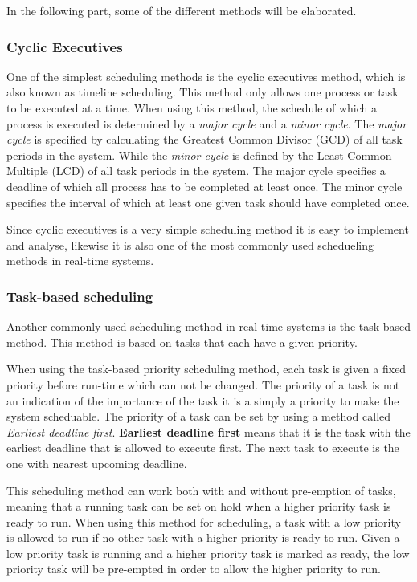 In the following part, some of the different methods will be elaborated. 

\subsubsection{Cyclic Executives}
One of the simplest scheduling methods is the cyclic executives method, which is also known as timeline scheduling.
This method only allows one process or task to be executed at a time. 
When using this method, the schedule of which a process is executed is determined by a \textit{major cycle} and a \textit{minor cycle}.
The \textit{major cycle} is specified by calculating the Greatest Common Divisor (GCD) of all task periods in the system.
While the \textit{minor cycle} is defined by the Least Common Multiple (LCD) of all task periods in the system. 
The major cycle specifies a deadline of which all process has to be completed at least once.
The minor cycle specifies the interval of which at least one given task should have completed once. 

Since cyclic executives is a very simple scheduling method it is easy to implement and analyse, likewise it is also one of the most commonly used schedueling methods in real-time systems\cite{RealTimeEmbeddedSystems}. 

\subsubsection{Task-based scheduling}
Another commonly used scheduling method in real-time systems is the task-based method. 
This method is based on tasks that each have a given priority.

When using the task-based priority scheduling method, each task is given a fixed priority before run-time which can not be changed.
The priority of a task is not an indication of the importance of the task it is a simply a priority to make the system scheduable\cite{RealTimeEmbeddedSystems}. 
The priority of a task can be set by using a method called \textit{Earliest deadline first}.
\textbf{Earliest deadline first} means that it is the task with the earliest deadline that is allowed to execute first.
The next task to execute is the one with nearest upcoming deadline.

This scheduling method can work both with and without pre-emption of tasks, meaning that a running task can be set on hold when a higher priority task is ready to run.
When using this method for scheduling, a task with a low priority is allowed to run if no other task with a higher priority is ready to run. 
Given a low priority task is running and a higher priority task is marked as ready, the low priority task will be pre-empted in order to allow the higher priority to run.

